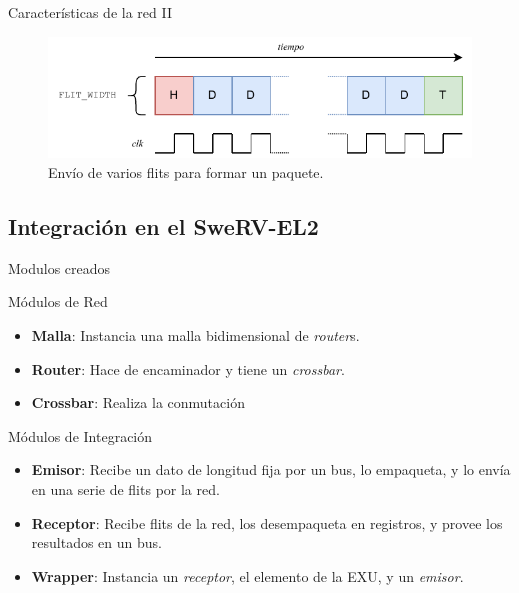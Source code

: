 \begin{frame}{Características de la red II}
    \begin{figure}
        \centering
        \includegraphics[width=.7\linewidth]{Images/packets.drawio.pdf}
        \caption{Envío de varios flits para formar un paquete.}
        \label{fig:packet}
    \end{figure}
\end{frame}

\subsection{Integración en el SweRV-EL2}

\begin{frame}{Modulos creados}
    \begin{block}{Módulos de Red}
        \begin{itemize}[<+->]
            \item \textbf{Malla}: Instancia una malla bidimensional de \textit{router}s.
            \item \textbf{Router}: Hace de encaminador y tiene un \textit{crossbar}.
            \item \textbf{Crossbar}: Realiza la conmutación
        \end{itemize}
    \end{block}
    \onslide<+->
    \begin{block}{Módulos de Integración}
        \begin{itemize}[<+->]
            \item \textbf{Emisor}: Recibe un dato de longitud fija por un bus, lo empaqueta, y lo envía en una serie de flits por la red.
            \item \textbf{Receptor}: Recibe flits de la red, los desempaqueta en registros, y provee los resultados en un bus.
            \item \textbf{Wrapper}: Instancia un \textit{receptor}, el elemento de la EXU, y un \textit{emisor}.
        \end{itemize}
    \end{block}
\end{frame}

